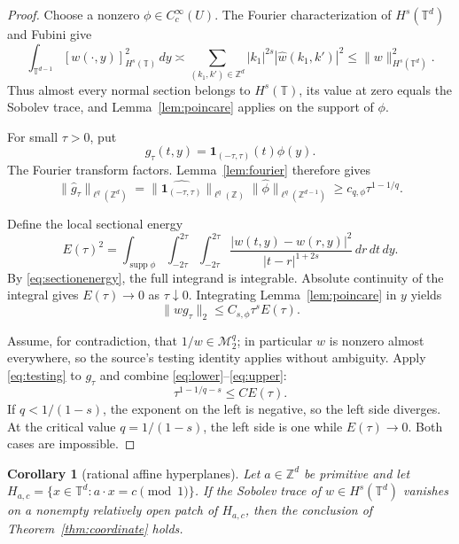\documentclass[11pt]{article}
\newtheorem{corollary}{Corollary}
\newcommand{\T}{\mathbb T}
\newcommand{\Z}{\mathbb Z}
\newcommand{\M}{\mathcal M}
\begin{document}
\begin{proof}
Choose a nonzero $\phi\in C_c^\infty(U)$.  The Fourier characterization of
$H^s(\T^d)$ and Fubini give
\begin{equation}\label{eq:sectionenergy}
 \int_{\T^{d-1}}[w(\cdot,y)]_{H^s(\T)}^2\,dy
 \asymp \sum_{(k_1,k')\in\Z^d}|k_1|^{2s}|\widehat w(k_1,k')|^2
 \le \|w\|_{H^s(\T^d)}^2.
\end{equation}
Thus almost every normal section belongs to $H^s(\T)$, its value at zero
equals the Sobolev trace, and Lemma~\ref{lem:poincare} applies on the support
of $\phi$.

For small $\tau>0$, put
\[
 g_\tau(t,y)=\mathbf1_{(-\tau,\tau)}(t)\phi(y).
\]
The Fourier transform factors.  Lemma~\ref{lem:fourier} therefore gives
\begin{equation}\label{eq:lower}
 \|\widehat g_\tau\|_{\ell^q(\Z^d)}
 =\|\widehat{\mathbf1_{(-\tau,\tau)}}\|_{\ell^q(\Z)}
   \|\widehat\phi\|_{\ell^q(\Z^{d-1})}
 \ge c_{q,\phi}\tau^{1-1/q}.
\end{equation}

Define the local sectional energy
\[
 E(\tau)^2=
 \int_{\operatorname{supp}\phi}
 \int_{-2\tau}^{2\tau}\int_{-2\tau}^{2\tau}
 \frac{|w(t,y)-w(r,y)|^2}{|t-r|^{1+2s}}\,dr\,dt\,dy.
\]
By \eqref{eq:sectionenergy}, the full integrand is integrable.  Absolute
continuity of the integral gives $E(\tau)\to0$ as $\tau\downarrow0$.
Integrating Lemma~\ref{lem:poincare} in $y$ yields
\begin{equation}\label{eq:upper}
 \|wg_\tau\|_2\le C_{s,\phi}\tau^sE(\tau).
\end{equation}

Assume, for contradiction, that $1/w\in\M_2^q$; in particular $w$ is
nonzero almost everywhere, so the source's testing identity applies without
ambiguity.  Apply
\eqref{eq:testing} to $g_\tau$ and combine \eqref{eq:lower}--\eqref{eq:upper}:
\[
 \tau^{1-1/q-s}\le C E(\tau).
\]
If $q<1/(1-s)$, the exponent on the left is negative, so the left side
diverges.  At the critical value $q=1/(1-s)$, the left side is one while
$E(\tau)\to0$.  Both cases are impossible.
\end{proof}

\begin{corollary}[rational affine hyperplanes]\label{cor:rational}
Let $a\in\Z^d$ be primitive and let
$H_{a,c}=\{x\in\T^d:a\cdot x=c\pmod1\}$.  If the Sobolev trace of
$w\in H^s(\T^d)$ vanishes on a nonempty relatively open patch of
$H_{a,c}$, then the conclusion of Theorem~\ref{thm:coordinate} holds.
\end{corollary}
\end{document}
